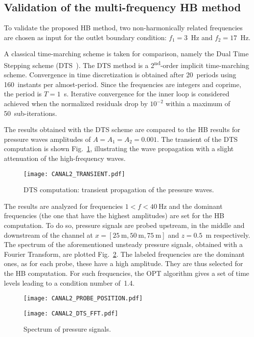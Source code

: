 \subsection{Validation of the multi-frequency HB method}

To validate the proposed HB method, two non-harmonically related
frequencies are chosen as input for the outlet boundary condition:
$f_1 = 3$~Hz and $f_2 = 17$~Hz.

A classical time-marching scheme is taken for comparison, namely the
Dual Time Stepping scheme (DTS~\cite{Jameson1991}).  The DTS method is
a 2\textsuperscript{nd}-order implicit time-marching scheme.
Convergence in time discretization is obtained after 20~periods using
160~instants per almost-period. Since the frequencies are integers and
coprime, the period is $T=1$~s.  Iterative convergence for the
inner loop is considered achieved when the normalized residuals drop
by $10^{-2}$ within a maximum of 50~sub-iterations.

The results obtained with the DTS scheme are compared to the HB
results for pressure waves amplitudes of $A = A_1 = A_2 = 0.001$.  The
transient of the DTS computation is shown
Fig.~\ref{fig:canal2_transient}, illustrating the wave propagation
with a slight attenuation of the high-frequency waves.
\begin{figure}[htbp]
  \centering
  \texttt{[image: CANAL2\_TRANSIENT.pdf]}
  \caption{DTS computation: transient propagation of the pressure waves.}
  \label{fig:canal2_transient}
\end{figure}


The results are analyzed for frequencies $1<f< 40~\textrm{Hz}$ and the
dominant frequencies (the one that have the highest amplitudes) are
set for the HB computation.  To do so, pressure signals are probed
upstream, in the middle and downstream of the channel at
$x=[25~\textrm{m}, 50~\textrm{m}, 75~\textrm{m}]$ and $z=0.5$~m
respectively.  The spectrum of the aforementioned unsteady pressure
signals, obtained with a Fourier Transform, are plotted
Fig.~\ref{fig:canal2_dts_fft}.  The labeled frequencies are the
dominant ones, as for each probe, these have a high amplitude. They
are thus selected for the HB computation.  For such frequencies, the
OPT algorithm gives a set of time levels leading to a condition number
of~1.4.
\begin{figure}[htb]
  \centering
  \texttt{[image: CANAL2\_PROBE\_POSITION.pdf]}

  \vspace{1em}

  \texttt{[image: CANAL2\_DTS\_FFT.pdf]}
  \caption{Spectrum of pressure signals.}
  \label{fig:canal2_dts_fft}
\end{figure}

